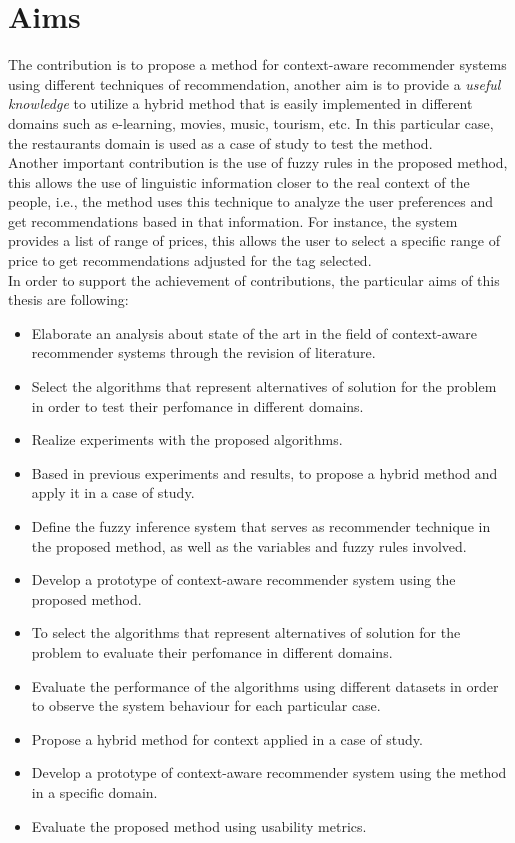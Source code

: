 \section{Aims}

The contribution is to propose a method for context-aware recommender
systems using different techniques of recommendation, another aim is
to provide a \textit{useful knowledge} to utilize a hybrid method that
is easily implemented in different domains such as e-learning, movies,
music, tourism, etc. In this particular case, the restaurants domain
is used as a case of study to test the method.\\
Another important contribution is the use of fuzzy rules in the
proposed method, this allows the use of linguistic information closer
to the real context of the people, i.e., the method uses this
technique to analyze the user preferences and get recommendations
based in that information. For instance, the system provides a list of
range of prices, this allows the user to select a specific range of
price to get recommendations adjusted for the tag selected.\\ In order
to support the achievement of contributions, the particular aims of
this thesis are following:
\begin{itemize}  
\item Elaborate an analysis about state of the art in the field
of context-aware recommender systems through  the revision of
literature. 
\item Select the algorithms that represent alternatives of
solution for the problem in order to test their perfomance in different
domains.
\item Realize experiments with the proposed algorithms.
\item Based in previous experiments and results, to propose a hybrid
method and apply it in a case of study.
\item Define the fuzzy inference system that serves as recommender
technique in the proposed method, as well as the variables and fuzzy
rules involved.
\item Develop a prototype of context-aware recommender system 
using the proposed method.
\item To select the algorithms that represent alternatives of
solution for the problem to evaluate their perfomance in different
domains.
\item Evaluate the performance of the algorithms using 
different datasets in order to observe the system behaviour 
for each particular case.
\item Propose a hybrid method for context applied in a case of
study.
\item Develop a prototype of context-aware recommender system 
using the method in a specific domain.
\item Evaluate the proposed method using usability metrics.
\end{itemize} 

